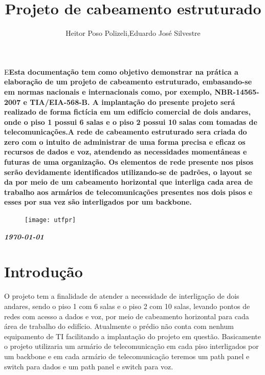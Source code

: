 \documentclass[	DIV=calc,%
							paper=a4,%
							fontsize=12pt,%
							onecolumn]{scrartcl}	 					%
\title{Projeto de cabeamento estruturado}					%
\author{Heitor Poso Polizeli,Eduardo José Silvestre}  	%
\date{}																				%
\newcommand{\initial}[1]{%
     \lettrine[lines=3,lhang=0.3,nindent=0em]{
     				\color{DarkGoldenrod}
     				{\textsf{#1}}}{}}
\begin{document}
\maketitle
\thispagestyle{fancy} 	
\thispagestyle{empty}		%




\initial{E}\textbf{Esta documentação tem como objetivo demonstrar na prática a elaboração de um projeto
	de cabeamento estruturado, embasando-se em normas nacionais e internacionais como,
	por exemplo, NBR-14565-2007 e TIA/EIA-568-B. A implantação do presente projeto será realizado de forma fictícia em um edifício comercial de dois andares, onde o piso 1 possui 6 salas e o piso 2 possui 10 salas com tomadas de telecomunicações.A rede de cabeamento estruturado sera criada do zero com o intuito de administrar de uma forma precisa e eficaz os recursos de dados e voz, atendendo as necessidades momentâneas e futuras de uma organização. Os elementos de rede presente nos pisos serão devidamente identificados utilizando-se de padrões, o layout se da por meio de um cabeamento horizontal que interliga cada area de trabalho aos armários de telecomunicações presentes nos dois pisos e esses por sua vez são interligados por um backbone.     }

\begin{figure}
	\centering
	\texttt{[image: utfpr]}
\end{figure}

\vspace{3cm}
\centerline{\textit{\textbf{\today}}}

\clearpage
    \renewcommand*\listfigurename{Lista de figuras}
\listoffigures

\renewcommand*\listtablename{Lista de tabelas}
\listoftables




\clearpage
\renewcommand{\contentsname}{Sumário}
\tableofcontents
\clearpage

\section{Introdução}
  O projeto tem a finalidade de atender a necessidade de interligação de dois andares, sendo
  o piso 1 com 6 salas e o piso 2 com 10 salas, levando pontos de redes com acesso a dados e
  voz, por meio de cabeamento horizontal para cada área de trabalho do edifício. Atualmente
  o prédio  não conta com nenhum equipamento de TI facilitando a implantação do projeto
  em questão. Basicamente o projeto utilizaria um armário de telecomunicação em cada piso interligados por um backbone e em cada armário de telecomunicação teremos um path panel e switch para dados e um path panel e switch para voz. 
  
\end{document}
